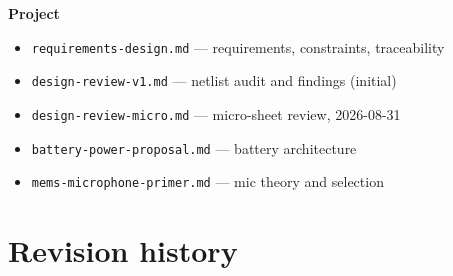 \documentclass[11pt]{article}
\begin{document}
\textbf{Project}
\begin{itemize}[leftmargin=1.4em]
\item \texttt{requirements-design.md} — requirements, constraints, traceability
\item \texttt{design-review-v1.md} — netlist audit and findings (initial)
\item \texttt{design-review-micro.md} — micro-sheet review, 2026-08-31
\item \texttt{battery-power-proposal.md} — battery architecture
\item \texttt{mems-microphone-primer.md} — mic theory and selection
\end{itemize}

\section{Revision history}
\end{document}
